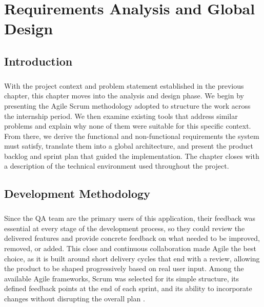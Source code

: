 
\chapter{Requirements Analysis and Global Design}


\section*{Introduction}

\paragraph{}With the project context and problem statement established in
the previous chapter, this chapter moves into the analysis and design phase.
We begin by presenting the Agile Scrum methodology adopted to structure the
work across the internship period. We then examine existing tools that
address similar problems and explain why none of them were suitable for this
specific context. From there, we derive the functional and non-functional
requirements the system must satisfy, translate them into a global
architecture, and present the product backlog and sprint plan that guided
the implementation. The chapter closes with a description of the technical
environment used throughout the project.


\section{Development Methodology}

\paragraph{}Since the QA team are the primary users of this application, their feedback was essential at every stage of the development process, so they could review the delivered features and provide concrete feedback on what needed to be improved, removed, or added. This close and continuous collaboration made Agile the best choice, as it is built around short delivery cycles that end with a review, allowing the product to be shaped progressively based on real user input. Among the available Agile frameworks, Scrum was selected for its simple structure, its defined feedback points at the end of each sprint, and its ability to incorporate changes without disrupting the overall plan \cite{schwaber2020scrum}.


